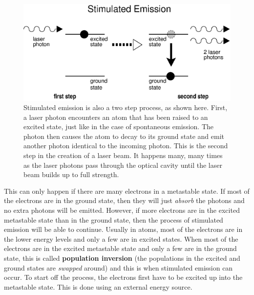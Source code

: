 \begin{figure}[!h]
\begin{center}
\includegraphics[width=5.in]{../../epsimages/laser-amplification_2.eps}
\end{center}
\caption{Stimulated emission is also a two step process, as shown here.  First, a laser photon encounters an atom that has been raised to an excited state, just like in the case of spontaneous emission.  The photon then causes the atom to decay to its ground state and emit another photon identical to the incoming photon.  This is the second step in the creation of a laser beam.  It happens many, many times as the laser photons pass through the optical cavity until the laser beam builds up to full strength.}
\label{laseramp}
\end{figure}


This can only happen if there are many electrons in a metastable state. If most of the electrons are in the ground state, then they will just \textit{absorb} the photons and no extra photons will be emitted. However, if more electrons are in the excited metastable state than in the ground state, then the process of stimulated emission will be able to continue. Usually in atoms, most of the electrons are in the lower energy levels and only a few are in excited states. When most of the electrons are in the excited metastable state and only a few are in the ground state, this is called \textbf{population inversion} (the populations in the excited and ground states are \textit{swapped} around) and this is when stimulated emission can occur. To start off the process, the electrons first have to be excited up into the metastable state. This is done using an external energy source.




